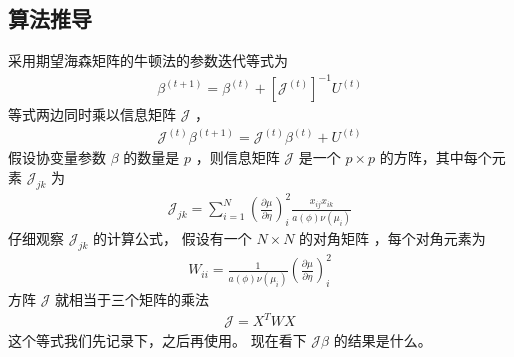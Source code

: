\documentclass[letterpaper,10pt,english]{sphinxmanual}
\begin{document}
\subsection{算法推导}
\label{\detokenize{_u5e7f_u4e49_u7ebf_u6027_u6a21_u578b/estimate:id10}}
采用期望海森矩阵的牛顿法的参数迭代等式为
\begin{equation}\label{equation:广义线性模型/estimate:广义线性模型/estimate:34}
\begin{split}\beta^{(t+1)} = \beta^{(t)} + [\mathcal{J}^{(t)}]^{-1} U^{(t)}\end{split}
\end{equation}
等式两边同时乘以信息矩阵 \(\mathcal{J}\) ，
\begin{equation}\label{equation:广义线性模型/estimate:eq_glm_estimate_039}
\begin{split}\mathcal{J}^{(t)}\beta^{(t+1)} = \mathcal{J}^{(t)} \beta^{(t)} +  U^{(t)}\end{split}
\end{equation}
假设协变量参数 \(\beta\) 的数量是 \(p\)
，则信息矩阵 \(\mathcal{J}\) 是一个 \(p\times p\)
的方阵，其中每个元素 \(\mathcal{J}_{jk}\) 为
\begin{equation}\label{equation:广义线性模型/estimate:广义线性模型/estimate:35}
\begin{split}\mathcal{J}_{jk}=
\sum_{i=1}^N
\left ( \frac{\partial \mu}{\partial \eta} \right )^2_i  \frac{  x_{ij} x_{ik}}{ a(\phi) \nu(\mu_i) }\end{split}
\end{equation}
仔细观察 \(\mathcal{J}_{jk}\) 的计算公式，
假设有一个 \(N\times N\) 的对角矩阵
，每个对角元素为
\begin{equation}\label{equation:广义线性模型/estimate:eq_glm_estimate_040}
\begin{split}W_{ii} =  \frac{ 1}{ a(\phi) \nu(\mu_i) }
\left ( \frac{\partial \mu}{\partial \eta} \right )^2_i\end{split}
\end{equation}
方阵 \(\mathcal{J}\) 就相当于三个矩阵的乘法
\begin{equation}\label{equation:广义线性模型/estimate:eq_glm_estimate_041}
\begin{split}\mathcal{J} = X^T W X\end{split}
\end{equation}
这个等式我们先记录下，之后再使用。
现在看下 \(\mathcal{J} \beta\) 的结果是什么。
\end{document}
